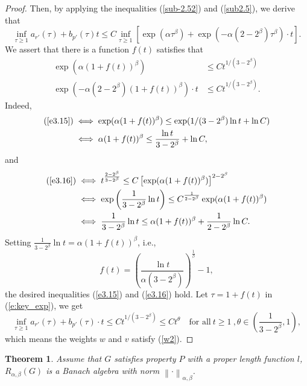 \documentclass[preprint,11pt]{elsarticle}
\newtheorem{theorem}{Theorem}[section]
\numberwithin{equation}{section}
\begin{document}
\begin{proof}
		\noindent Then, by applying the inequalities (\ref{sub-2.52}) and (\ref{sub2.5}), we derive that
		\begin{equation}
			\label{e:key_exp}
			\inf_{\tau\ge 1} a_{r'}(\tau ) +b_{p'}(\tau ) t
			\le C\inf_{\tau\ge 1} [\exp(\alpha \tau^\beta) + \exp(-\alpha(2-2^{\beta}) \tau^{\beta } )\cdot t].
		\end{equation}
		We assert that there is a function $f(t)$ satisfies that		
		\begin{align}
			\exp(\alpha(1+f(t))^\beta)&\le Ct^{1/(3-2^\beta)}\label{e3.15}\\
			\exp(-\alpha(2-2^\beta)(1+f(t))^\beta)\cdot t&\le Ct^{1/(3-2^\beta)}\label{e3.16}.
		\end{align}
		Indeed, 
		\begin{align*}
			(\ref{e3.15}) &\iff \exp(\alpha(1+f(t))^\beta)\leq \exp(1/(3-2^\beta)\ln t+\ln C)\\
			&\iff \alpha(1+f(t))^\beta \leq \frac{\ln t}{3-2^\beta}+\ln C,
		\end{align*}
		and 
		\begin{align*}
			(\ref{e3.16})&\iff t^{\frac{2-2^\beta}{3-2^\beta}}\leq C\left[ \exp(\alpha(1+f(t))^\beta)\right]^{2-2^\beta}\\
			&\iff \exp\left(\frac{1}{3-2^\beta}\ln t\right)\leq C^{\frac{1}{2-2^\beta}}\exp(\alpha(1+f(t))^\beta)\\
			&\iff \frac{1}{3-2^\beta}\ln t\leq \alpha(1 + f(t))^\beta +\frac{1}{2-2^\beta}\ln C.
		\end{align*}
		Setting $\frac{1}{3-2^\beta}\ln t= \alpha(1 + f(t))^\beta$, i.e., 
		$$f(t)= \left(\frac{\ln t}{\alpha(3-2^\beta)}\right)^{\frac{1}{\beta}}-1,$$
		the desired inequalities (\ref{e3.15}) and (\ref{e3.16}) hold.
		Let $\tau=1+f(t)$ in (\ref{e:key_exp}), we get 
		\[\inf_{\tau\ge 1} a_{r'}(\tau ) +b_{p'}(\tau ) \cdot t\le Ct^{ 1/(3-2^{\beta })}\le Ct^{\theta}\quad \text{for~all}~t\ge 1~,\theta\in (\frac{1}{3-2^{\beta}},1),\]
		which means the weights $w$ and $v$ satisfy (\ref{w2}).
	\end{proof}
	\begin{theorem}\label{banach-2}
		Assume that $G$ satisfies property $P$ with a proper length function $l$, $R_{\alpha,\beta }(G)$ is a Banach algebra with norm $\left \| \cdot \right \|_{\alpha,\beta }$.    
	\end{theorem}
\end{document}
